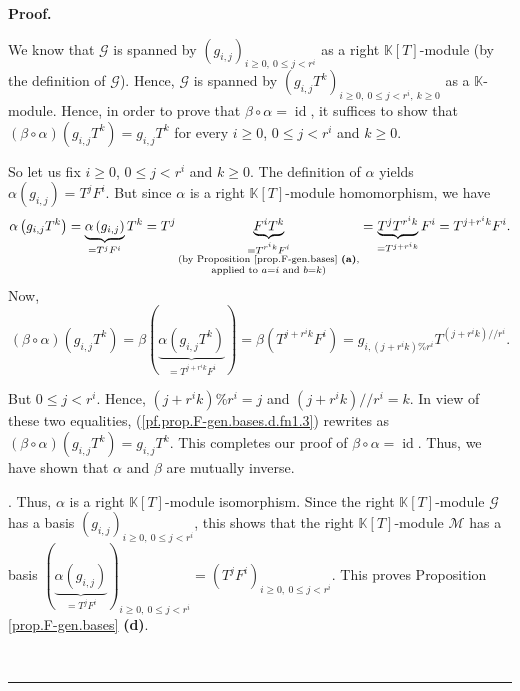 \documentclass[numbers=enddot,12pt,final,onecolumn,notitlepage]{scrartcl}%
\theoremstyle{definition}
\newenvironment{proof}[1][Proof]{\noindent\textbf{#1.} }{\ \rule{0.5em}{0.5em}}
\begin{document}
\begin{proof}
{\par
We know that $\mathcal{G}$ is spanned by $\left(  g_{i,j}\right)
_{i\geq0,\ 0\leq j<r^{i}}$ as a right $\mathbb{K}\left[  T\right]  $-module
(by the definition of $\mathcal{G}$). Hence, $\mathcal{G}$ is spanned by
$\left(  g_{i,j}T^{k}\right)  _{i\geq0,\ 0\leq j<r^{i},\ k\geq0}$ as a
$\mathbb{K}$-module. Hence, in order to prove that $\beta\circ\alpha
=\operatorname*{id}$, it suffices to show that $\left(  \beta\circ
\alpha\right)  \left(  g_{i,j}T^{k}\right)  =g_{i,j}T^{k}$ for every $i\geq0$,
$0\leq j<r^{i}$ and $k\geq0$.
\par
So let us fix $i\geq0$, $0\leq j<r^{i}$ and $k\geq0$. The definition of
$\alpha$ yields $\alpha\left(  g_{i,j}\right)  =T^{j}F^{i}$. But since
$\alpha$ is a right $\mathbb{K}\left[  T\right]  $-module homomorphism, we
have%
\[
\alpha\left(  g_{i,j}T^{k}\right)  =\underbrace{\alpha\left(  g_{i,j}\right)
}_{=T^{j}F^{i}}T^{k}=T^{j}\underbrace{F^{i}T^{k}}_{\substack{=T^{r^{i}k}%
F^{i}\\\text{(by Proposition \ref{prop.F-gen.bases} \textbf{(a)}%
,}\\\text{applied to }a=i\text{ and }b=k\text{)}}}=\underbrace{T^{j}T^{r^{i}%
k}}_{=T^{j+r^{i}k}}F^{i}=T^{j+r^{i}k}F^{i}.
\]
Now,%
\begin{equation}
\left(  \beta\circ\alpha\right)  \left(  g_{i,j}T^{k}\right)  =\beta\left(
\underbrace{\alpha\left(  g_{i,j}T^{k}\right)  }_{=T^{j+r^{i}k}F^{i}}\right)
=\beta\left(  T^{j+r^{i}k}F^{i}\right)  =g_{i,\left(  j+r^{i}k\right)
\%r^{i}}T^{\left(  j+r^{i}k\right)  //r^{i}}.
\label{pf.prop.F-gen.bases.d.fn1.3}%
\end{equation}
\par
But $0\leq j<r^{i}$. Hence, $\left(  j+r^{i}k\right)  \%r^{i}=j$ and $\left(
j+r^{i}k\right)  //r^{i}=k$. In view of these two equalities,
(\ref{pf.prop.F-gen.bases.d.fn1.3}) rewrites as $\left(  \beta\circ
\alpha\right)  \left(  g_{i,j}T^{k}\right)  =g_{i,j}T^{k}$. This completes our
proof of $\beta\circ\alpha=\operatorname*{id}$. Thus, we have shown that
$\alpha$ and $\beta$ are mutually inverse.}. Thus, $\alpha$ is a right
$\mathbb{K}\left[  T\right]  $-module isomorphism. Since the right
$\mathbb{K}\left[  T\right]  $-module $\mathcal{G}$ has a basis $\left(
g_{i,j}\right)  _{i\geq0,\ 0\leq j<r^{i}}$, this shows that the right
$\mathbb{K}\left[  T\right]  $-module $\mathcal{M}$ has a basis $\left(
\underbrace{\alpha\left(  g_{i,j}\right)  }_{=T^{j}F^{i}}\right)
_{i\geq0,\ 0\leq j<r^{i}}=\left(  T^{j}F^{i}\right)  _{i\geq0,\ 0\leq j<r^{i}%
}$. This proves Proposition \ref{prop.F-gen.bases} \textbf{(d)}. \medskip


\end{proof}
\end{document}

